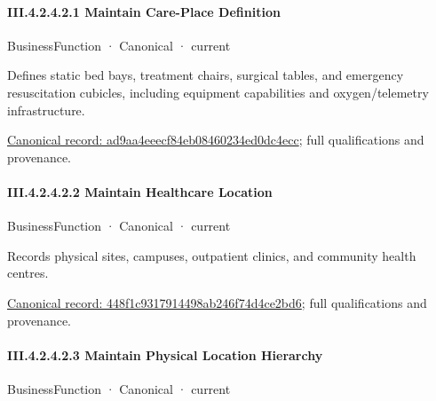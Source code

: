 \paragraph*{III.4.2.4.2.1 Maintain Care-Place Definition}
\label{navigation:III.4.2.4.2.1}

\label{element:ad9aa4eeecf84eb08460234ed0dc4ecc}
{\small BusinessFunction · Canonical · current}\par

Defines static bed bays, treatment chairs, surgical tables, and emergency resuscitation cubicles, including equipment capabilities and oxygen/telemetry infrastructure.


{\footnotesize \href{../../../../continuum/business/business-function/ad9aa4eeecf84eb08460234ed0dc4ecc.md}{Canonical record: ad9aa4eeecf84eb08460234ed0dc4ecc}; full qualifications and provenance.}\par
\paragraph*{III.4.2.4.2.2 Maintain Healthcare Location}
\label{navigation:III.4.2.4.2.2}

\label{element:448f1c9317914498ab246f74d4ce2bd6}
{\small BusinessFunction · Canonical · current}\par

Records physical sites, campuses, outpatient clinics, and community health centres.


{\footnotesize \href{../../../../continuum/business/business-function/448f1c9317914498ab246f74d4ce2bd6.md}{Canonical record: 448f1c9317914498ab246f74d4ce2bd6}; full qualifications and provenance.}\par
\paragraph*{III.4.2.4.2.3 Maintain Physical Location Hierarchy}
\label{navigation:III.4.2.4.2.3}

\label{element:d217a5cd3a3d40e9a89068d1680ec45f}
{\small BusinessFunction · Canonical · current}\par

